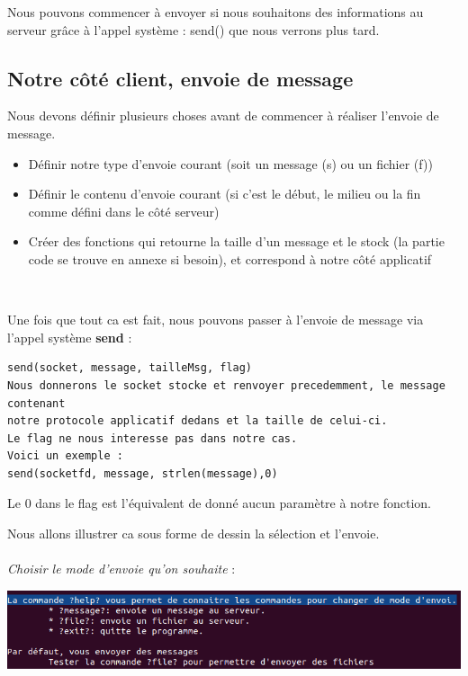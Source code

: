 Nous pouvons commencer à envoyer si nous souhaitons des informations au serveur grâce à l'appel système : send() que nous verrons plus tard.

\subsection{Notre côté client, envoie de message}

Nous devons définir plusieurs choses avant de commencer à réaliser l'envoie de message. \\ \par

\begin{itemize}
\item Définir notre type d'envoie courant (soit un message (s) ou un fichier (f))
\item Définir le contenu d'envoie courant (si c'est le début, le milieu ou la fin comme défini dans le côté serveur)
\item Créer des fonctions qui retourne la taille d'un message et le stock (la partie code se trouve en annexe si besoin), et correspond à notre côté applicatif
\end{itemize}\hfill \\ \par

Une fois que tout ca est fait, nous pouvons passer à l'envoie de message via l'appel système \textbf{send} :
\begin{lstlisting}
send(socket, message, tailleMsg, flag)
Nous donnerons le socket stocke et renvoyer precedemment, le message contenant
notre protocole applicatif dedans et la taille de celui-ci.
Le flag ne nous interesse pas dans notre cas.
Voici un exemple :
send(socketfd, message, strlen(message),0)
\end{lstlisting}

Le 0 dans le flag est l'équivalent de donné aucun paramètre à notre fonction. \\ \par

Nous allons illustrer ca sous forme de dessin la sélection et l'envoie. \\ \\

\textit{Choisir le mode d'envoie qu'on souhaite} :

    {
    \centering
    \includegraphics[width=18cm]{figures/selection_type_client.png}
    \par
    } \hfill \\ \par

